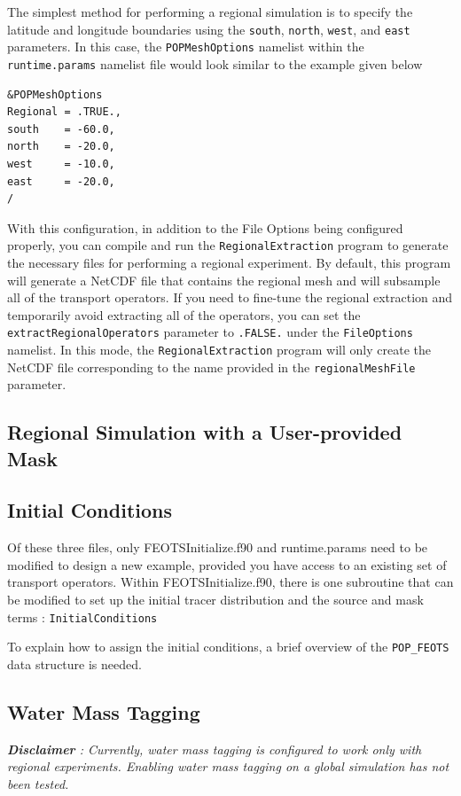 \documentclass{softwaremanual}
\begin{document}
 The simplest method for performing a regional simulation is to specify the latitude and longitude boundaries using the \texttt{south}, \texttt{north}, \texttt{west}, and \texttt{east} parameters. In this case, the \texttt{POPMeshOptions} namelist within the \texttt{runtime.params} namelist file would look similar to the example given below
\begin{verbatim}
&POPMeshOptions
Regional = .TRUE.,
south    = -60.0,
north    = -20.0,
west     = -10.0,
east     = -20.0,
/
\end{verbatim}
With this configuration, in addition to the File Options being configured properly, you can compile and run the \texttt{RegionalExtraction} program to generate the necessary files for performing a regional experiment. By default, this program will generate a NetCDF file that contains the regional mesh and will subsample all of the transport operators. If you need to fine-tune the regional extraction and temporarily avoid extracting all of the operators, you can set the \texttt{extractRegionalOperators} parameter to \texttt{.FALSE.} under the \texttt{FileOptions} namelist. In this mode, the \texttt{RegionalExtraction} program will only create the NetCDF file corresponding to the name provided in the \texttt{regionalMeshFile} parameter.

\subsection{Regional Simulation with a User-provided Mask}

\subsection{Initial Conditions}
Of these three files, only FEOTSInitialize.f90 and runtime.params need to be modified to design a new example, provided you have access to an existing set of transport operators. Within FEOTSInitialize.f90, there is one subroutine that can be modified to set up the initial tracer distribution and the source and mask terms  : \texttt{InitialConditions}

To explain how to assign the initial conditions, a brief overview of the \texttt{POP\_FEOTS} data structure is needed.
 
 

\subsection{Water Mass Tagging}
 \textit{\textbf{Disclaimer} : Currently, water mass tagging is configured to work only with regional experiments. Enabling water mass tagging on a global simulation has not been tested.}
 
\end{document}
